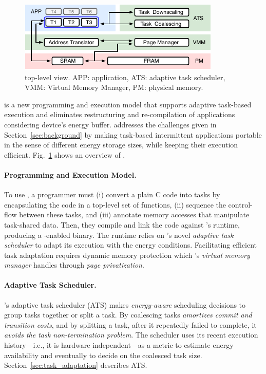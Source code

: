 \begin{figure}
	\centering
	\includegraphics[width=.8\columnwidth]{figures/system-overview.pdf}
	\caption{\sys top-level view. APP: application, ATS: adaptive task scheduler, VMM: Virtual Memory Manager, PM: physical memory.}
	\label{fig:system_overview}
\end{figure}

\sys is a new programming and execution model that supports adaptive task-based execution and eliminates restructuring and re-compilation of applications considering device's energy buffer. \sys addresses the challenges given in Section~\ref{sec:background} by making task-based intermittent applications portable in the sense of different energy storage sizes, while keeping their execution efficient. Fig.~\ref{fig:system_overview} shows an overview of \sys.

\paragraph{Programming and Execution Model.}
To use \sys, a programmer must (i) convert a plain C code into tasks by encapsulating the code in a top-level set of functions, (ii) sequence the control-flow between these tasks, and (iii) annotate memory accesses that manipulate task-shared data. Then, they compile and link the code against \sys's runtime, producing a \sys-enabled binary. The runtime relies on \sys's novel {\em adaptive task scheduler} to adapt its execution with the energy conditions. Facilitating efficient task adaptation requires dynamic memory protection which \sys's \emph{virtual memory manager} handles through \emph{page privatization}.

\paragraph{Adaptive Task Scheduler.}
\sys's adaptive task scheduler (ATS) makes \emph{energy-aware} scheduling decisions to group tasks together or split a task. By coalescing tasks \sys \emph{amortizes commit and transition costs}, and by splitting a task, after it repeatedly failed to complete, it \emph{avoids the task non-termination problem}. The scheduler uses its recent execution history---i.e., it is hardware independent---as a metric to estimate energy availability and eventually to decide on the coalesced task size. Section~\ref{sec:task_adaptation} describes ATS.

